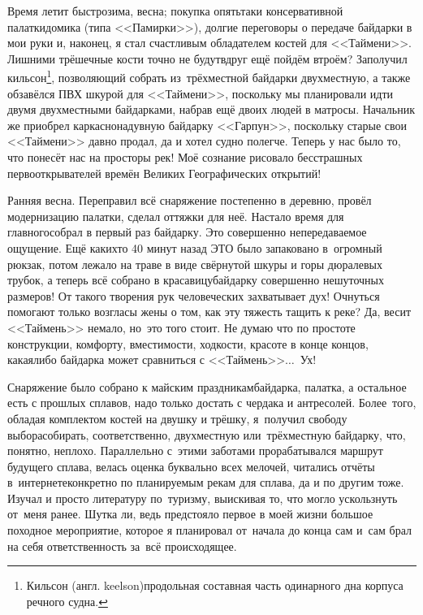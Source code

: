 Время летит быстро\mdash зима, весна; покупка опять\sdash таки консервативной палатки\sdash домика (типа <<Памирки>>), долгие переговоры о передаче байдарки в мои руки и, наконец, я стал счастливым обладателем костей для <<Таймени>>. Лишними трёшечные кости точно не будут\mdash вдруг ещё пойдём втроём? Заполучил кильсон\footnote{Кильсон (англ. keelson)\mdash продольная составная часть одинарного дна корпуса речного судна\cite{МорскойСправочник}.}, позволяющий собрать из~трёхместной байдарки двухместную, а также обзавёлся ПВХ шкурой для <<Таймени>>, поскольку мы планировали идти двумя двухместными байдарками, набрав ещё двоих людей в матросы. Начальник же приобрел каркасно\sdash надувную байдарку <<Гарпун>>, поскольку старые свои <<Таймени>> давно продал, да и хотел судно полегче. Теперь у нас было то, что понесёт нас на просторы рек! Моё сознание рисовало бесстрашных первооткрывателей времён Великих Географических открытий!

Ранняя весна. Переправил всё снаряжение постепенно в деревню, провёл модернизацию палатки, сделал оттяжки для неё. Настало время для главного\mdash собрал в первый раз байдарку. Это совершенно непередаваемое ощущение. Ещё каких\sdash то 40 минут назад ЭТО было запаковано в~огромный рюкзак, потом лежало на траве в виде свёрнутой шкуры и горы дюралевых трубок, а теперь всё собрано в красавицу\sdash байдарку совершенно нешуточных размеров! От такого творения рук человеческих захватывает дух! Очнуться помогают только возгласы жены о том, как эту тяжесть тащить к реке? Да, весит <<Таймень>> немало, но~это того стоит. Не думаю что по простоте конструкции, комфорту, вместимости, ходкости, красоте в конце концов, какая\sdash либо байдарка может сравниться с <<Таймень>>$\ldots$~Ух! 

Снаряжение было собрано к майским праздникам\mdash байдарка, палатка, а остальное есть с прошлых сплавов, надо только достать с чердака и антресолей. Более~того, обладая комплектом костей на двушку и трёшку, я~получил свободу выбора\mdash собирать, соответственно, двухместную или~трёхместную байдарку, что, понятно, неплохо. Параллельно с~этими заботами прорабатывался маршрут будущего сплава, велась оценка буквально всех мелочей, читались отчёты в~интернете\mdash конкретно по планируемым рекам для сплава, да и по другим тоже. Изучал и просто литературу по~туризму, выискивая то, что могло ускользнуть от~меня ранее. Шутка ли, ведь предстояло первое в моей жизни большое походное мероприятие, которое я планировал от~начала до конца сам и~сам брал на себя ответственность за~всё происходящее.

